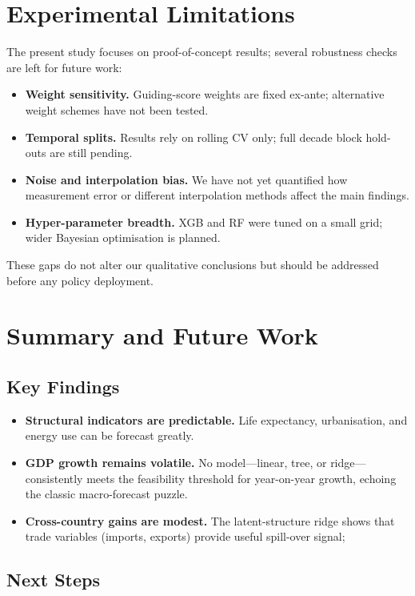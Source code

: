 \documentclass[12pt]{article}
\begin{document}
\section{Experimental Limitations}

The present study focuses on proof-of-concept results; several robustness checks are left for future work:

\begin{itemize}
  \item \textbf{Weight sensitivity.} Guiding-score weights are fixed ex-ante; alternative weight schemes have not been tested.
  \item \textbf{Temporal splits.} Results rely on rolling CV only; full decade block hold-outs are still pending.
  \item \textbf{Noise and interpolation bias.} We have not yet quantified how measurement error or different interpolation methods affect the main findings.
  \item \textbf{Hyper-parameter breadth.} XGB and RF were tuned on a small grid; wider Bayesian optimisation is planned.
\end{itemize}

These gaps do not alter our qualitative conclusions but should be addressed before any policy deployment.


\section{Summary and Future Work}
\subsection{Key Findings}

\begin{itemize}
  \item \textbf{Structural indicators are predictable.}  Life expectancy, urbanisation, and energy use can be forecast greatly.
  \item \textbf{GDP growth remains volatile.}  No model—linear, tree, or ridge—consistently meets the feasibility threshold for year-on-year growth, echoing the classic macro-forecast puzzle.
  \item \textbf{Cross-country gains are modest.}  The latent-structure ridge shows that trade variables (imports, exports) provide useful spill-over signal;
\end{itemize}

\subsection{Next Steps}
\end{document}

